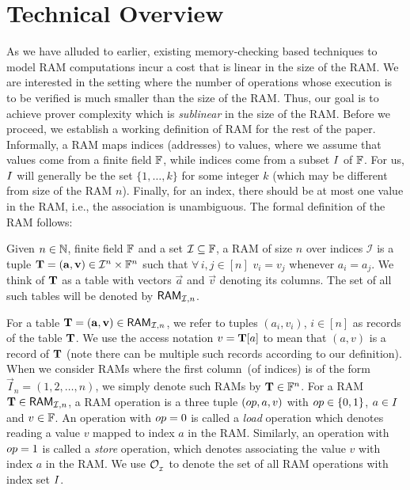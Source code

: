 \section{Technical Overview}\label{sec:tech-overview}
As we have alluded to earlier, existing memory-checking based techniques to model RAM computations incur a cost
that is linear in the size of the RAM. We are interested in the setting where the number of operations whose
execution is to be verified is much smaller than the size of the RAM. Thus, our goal is to achieve prover complexity
which is {\em sublinear} in the size of the RAM. Before we proceed, we establish a
working definition of RAM for the rest of the paper. Informally, a RAM maps indices (addresses) to values, where
we assume that values come from a finite field $\mathbb{F}$, while indices come from a subset $I$ of $\mathbb{F}$. For us,
$I$ will generally be the set $\{1,\ldots,k\}$ for some integer $k$ (which may be different from size of
the RAM $n$). Finally, for an index, there should be at most one value in the RAM, i.e., the association is unambiguous.
The formal definition of the RAM follows:
\begin{definition}[RAM]\label{defn:RAM}
Given $n\in \mathbb{N}$, finite field $\mathbb{F}$ and a set $\mathcal{I}\subseteq \mathbb{F}$, a RAM of size $n$ over indices $\mathcal{I}$
is a tuple $\mathbf{T}=(\mathbf{a},\mathbf{v})\in \mathcal{I}^n\times \mathbb{F}^n$ such that $\forall\, i,j\in [n]$  $v_i=v_j$ whenever $a_i=a_j$.
We think of $\mathbf{T}$ as a table with vectors $\vec{a}$ and $\vec{v}$ denoting its columns. The set of all such
tables will be denoted by $\mathsf{RAM}_{\mathcal{I}, {n}}$.
\end{definition}
For a table $\mathbf{T}=(\mathbf{a},\mathbf{v})\in \mathsf{RAM}_{\mathcal{I}, {n}}$, we refer to tuples $(a_i,v_i)$, $i\in [n]$ as records of the table $\mathbf{T}$.
We use the access notation $v=\mathbf{T}[a]$ to mean that $(a,v)$ is a record of $\mathbf{T}$ (note there can be multiple such records
according to our definition). When we consider RAMs where the first column~(of indices) is of the form $\vec{I}_n=(1,2,\ldots,n)$, we simply 
denote such RAMs by $\mathbf{T}\in\mathbb{F}^n$.
For a RAM $\mathbf{T}\in \mathsf{RAM}_{\mathcal{I}, {n}}$, a RAM operation is a three tuple $({op},a,v)$ with ${op}\in \{0,1\}$,
$a\in I$ and $v\in \mathbb{F}$. An operation with ${op}=0$ is called a {\em load} operation which denotes reading a value $v$
mapped to index $a$ in the RAM. Similarly, an operation with ${op}=1$ is called a {\em store} operation,
which denotes associating the value $v$ with index $a$ in the RAM.
We use $\mathcal{O}_{{}_\mathcal{I}}$ to denote the set of all RAM operations with index set $I$.


